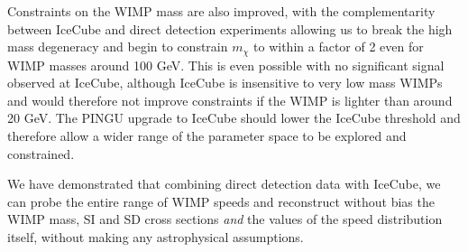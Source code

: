 Constraints on the WIMP mass are also improved, with the complementarity between IceCube and direct detection experiments allowing us to break the high mass degeneracy and begin to constrain $m_\chi$ to within a factor of 2 even for WIMP masses around 100 GeV. This is even possible with no significant signal observed at IceCube, although IceCube is insensitive to very low mass WIMPs and would therefore not improve constraints if the WIMP is lighter than around 20 GeV. The PINGU upgrade to IceCube \cite{Aartsen:2014} should lower the IceCube threshold and therefore allow a wider range of the parameter space to be explored and constrained.

We have demonstrated that combining direct detection data with IceCube, we can probe the entire range of WIMP speeds and reconstruct without bias the WIMP mass, SI and SD cross sections \textit{and} the values of the speed distribution itself, without making any astrophysical assumptions.



